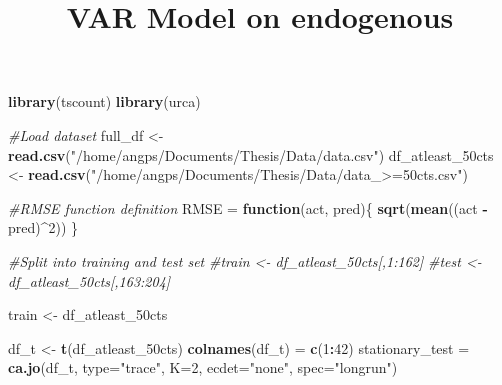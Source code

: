 \documentclass[]{article}
\title{VAR Model on endogenous}
\author{}
\date{}
\newenvironment{Shaded}{\begin{snugshade}}{\end{snugshade}}
\newcommand{\CommentTok}[1]{\textcolor[rgb]{0.56,0.35,0.01}{\textit{#1}}}
\newcommand{\ControlFlowTok}[1]{\textcolor[rgb]{0.13,0.29,0.53}{\textbf{#1}}}
\newcommand{\DataTypeTok}[1]{\textcolor[rgb]{0.13,0.29,0.53}{#1}}
\newcommand{\DecValTok}[1]{\textcolor[rgb]{0.00,0.00,0.81}{#1}}
\newcommand{\KeywordTok}[1]{\textcolor[rgb]{0.13,0.29,0.53}{\textbf{#1}}}
\newcommand{\NormalTok}[1]{#1}
\newcommand{\OperatorTok}[1]{\textcolor[rgb]{0.81,0.36,0.00}{\textbf{#1}}}
\newcommand{\StringTok}[1]{\textcolor[rgb]{0.31,0.60,0.02}{#1}}
\begin{document}
\maketitle

\begin{Shaded}
\begin{Highlighting}[]
\KeywordTok{library}\NormalTok{(tscount)}
\KeywordTok{library}\NormalTok{(urca)}
\end{Highlighting}
\end{Shaded}

\begin{Shaded}
\begin{Highlighting}[]
\CommentTok{#Load dataset}
\NormalTok{full_df <-}\StringTok{ }\KeywordTok{read.csv}\NormalTok{(}\StringTok{"/home/angps/Documents/Thesis/Data/data.csv"}\NormalTok{)}
\NormalTok{df_atleast_50cts <-}\StringTok{ }\KeywordTok{read.csv}\NormalTok{(}\StringTok{"/home/angps/Documents/Thesis/Data/data_>=50cts.csv"}\NormalTok{)}
\end{Highlighting}
\end{Shaded}

\begin{Shaded}
\begin{Highlighting}[]
\CommentTok{#RMSE function definition}
\NormalTok{RMSE =}\StringTok{ }\ControlFlowTok{function}\NormalTok{(act, pred)\{}
  \KeywordTok{sqrt}\NormalTok{(}\KeywordTok{mean}\NormalTok{((act }\OperatorTok{-}\StringTok{ }\NormalTok{pred)}\OperatorTok{^}\DecValTok{2}\NormalTok{))}
\NormalTok{\}}

\CommentTok{#Split into training and test set}
\CommentTok{#train <- df_atleast_50cts[,1:162]}
\CommentTok{#test <- df_atleast_50cts[,163:204]}

\NormalTok{train <-}\StringTok{ }\NormalTok{df_atleast_50cts}
\end{Highlighting}
\end{Shaded}

\begin{Shaded}
\begin{Highlighting}[]
\NormalTok{df_t <-}\StringTok{ }\KeywordTok{t}\NormalTok{(df_atleast_50cts)}
\KeywordTok{colnames}\NormalTok{(df_t) =}\StringTok{ }\KeywordTok{c}\NormalTok{(}\DecValTok{1}\OperatorTok{:}\DecValTok{42}\NormalTok{)}
\NormalTok{stationary_test =}\StringTok{ }\KeywordTok{ca.jo}\NormalTok{(df_t, }\DataTypeTok{type=}\StringTok{"trace"}\NormalTok{, }\DataTypeTok{K=}\DecValTok{2}\NormalTok{, }\DataTypeTok{ecdet=}\StringTok{"none"}\NormalTok{, }\DataTypeTok{spec=}\StringTok{"longrun"}\NormalTok{)}
\end{Highlighting}
\end{Shaded}
\end{document}
